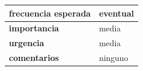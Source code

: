 \begin{table}[H]
\begin{tabular}{|l|l|l|}
		\textbf{frecuencia esperada}               & \multicolumn{2}{l|}{eventual}                 \\ \hline
		\textbf{importancia}                       & \multicolumn{2}{l|}{media}                 \\ \hline
		\textbf{urgencia}                          & \multicolumn{2}{l|}{media}                 \\ \hline
		\textbf{comentarios}                       & \multicolumn{2}{l|}{ninguno}                 \\ \hline
	\end{tabular}
\end{table}
